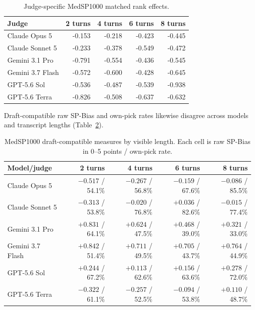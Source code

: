 \documentclass[11pt]{article}
\begin{document}
\begin{table}[htbp]
\centering
\small
\caption{Judge-specific MedSP1000 matched rank effects.}
\label{tab:med-judge}
\begin{tabular}{lrrrr}
\toprule
Judge & 2 turns & 4 turns & 6 turns & 8 turns \\
\midrule
Claude Opus 5 & -0.153 & -0.218 & -0.423 & -0.445 \\
Claude Sonnet 5 & -0.233 & -0.378 & -0.549 & -0.472 \\
Gemini 3.1 Pro & -0.791 & -0.554 & -0.436 & -0.545 \\
Gemini 3.7 Flash & -0.572 & -0.600 & -0.428 & -0.645 \\
GPT-5.6 Sol & -0.536 & -0.487 & -0.539 & -0.938 \\
GPT-5.6 Terra & -0.826 & -0.508 & -0.637 & -0.632 \\
\bottomrule
\end{tabular}
\end{table}
\FloatBarrier

Draft-compatible raw SP-Bias and own-pick rates likewise disagree across
models and transcript lengths (Table~\ref{tab:med-draft-scores}).

\begin{table}[htbp]
\centering
\scriptsize
\caption{MedSP1000 draft-compatible measures by visible length. Each cell is
raw SP-Bias in 0--5 points / own-pick rate.}
\label{tab:med-draft-scores}
\begin{tabular}{lrrrr}
\toprule
Model/judge & 2 turns & 4 turns & 6 turns & 8 turns \\
\midrule
Claude Opus 5 & $-0.517$ / 54.1\% & $-0.267$ / 56.8\% & $-0.159$ / 67.6\% & $-0.086$ / 85.5\% \\
Claude Sonnet 5 & $-0.313$ / 53.8\% & $-0.020$ / 76.8\% & $+0.036$ / 82.6\% & $-0.015$ / 77.4\% \\
Gemini 3.1 Pro & $+0.831$ / 64.1\% & $+0.624$ / 47.5\% & $+0.468$ / 39.0\% & $+0.321$ / 33.0\% \\
Gemini 3.7 Flash & $+0.842$ / 51.4\% & $+0.711$ / 49.5\% & $+0.705$ / 43.7\% & $+0.764$ / 44.9\% \\
GPT-5.6 Sol & $+0.244$ / 67.2\% & $+0.113$ / 62.6\% & $+0.156$ / 63.6\% & $+0.278$ / 72.0\% \\
GPT-5.6 Terra & $-0.322$ / 61.1\% & $-0.257$ / 52.5\% & $-0.094$ / 53.8\% & $+0.110$ / 48.7\% \\
\bottomrule
\end{tabular}
\end{table}
\FloatBarrier
\end{document}
